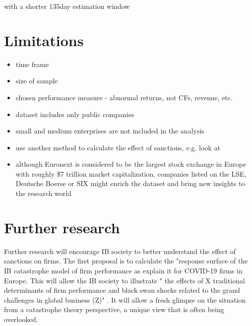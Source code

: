 \documentclass[12pt,a4paper]{article}
\begin{document}
with a shorter 135day estimation window \citep[p.~10]{kumari_are_2023}
\section{Limitations}
\label{chap:limitations}

\begin{itemize}
  \item time frame 
  \item size of sample
  \item chosen performance measure - abnormal returns, not CFs, revenue, etc.
  \item dataset includes only public companies
  \item small and medium enterprises are not included in the analysis 
  \item use another method to calculate the effect of sanctions, e.g. look at  \cite{gonzales_martinez_apocalypse_nodate}
  \item although Euronext is considered to be the largest stock exchange in Europe with roughly \$7 trillion market capitalization, companies listed on the LSE, Deutsche Boerse or SIX might enrich the dataset and bring new insights to the research world
\end{itemize}

\section{Further research}
\label{chap:further}
Further research will encourage IB society to better understand the effect of sanctions on firms. The first proposal is to calculate the "response surface of the IB catastrophe model of firm performance as \cite{gonzales_martinez_apocalypse_nodate} explain it for COVID-19 firms in Europe. This will allow the IB society to illustrate " the effects of X traditional determinants of firm performance and black swan shocks related to the grand challenges in global business (Z)" \citep{gonzales_martinez_apocalypse_nodate}. It will allow a fresh glimpse on the situation from a catastrophe theory perspective, a unique view that is often being overlooked.  
\end{document}
